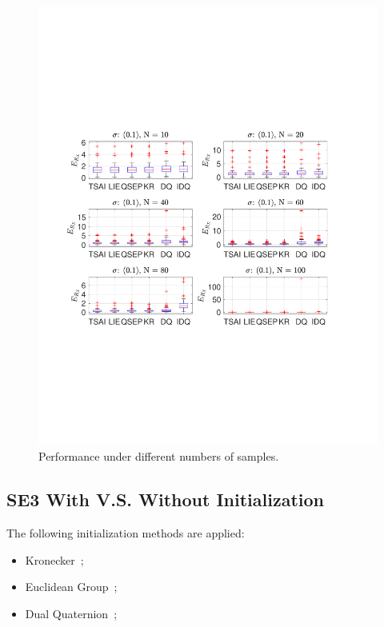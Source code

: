 \begin{figure}
\includegraphics[scale=0.6]{./hand_eye_figures/conv/conv_t_err_cmp1}
\caption{Performance under different numbers of samples.}
\end{figure}

\subsection{SE3 With V.S. Without Initialization}
The following initialization methods are applied:
\begin{itemize}
	\item Kronecker~\cite{andreff1999line};
	\item Euclidean Group~\cite{park1994robot};
	\item Dual Quaternion~\cite{daniilidis1999hand};
\end{itemize}

